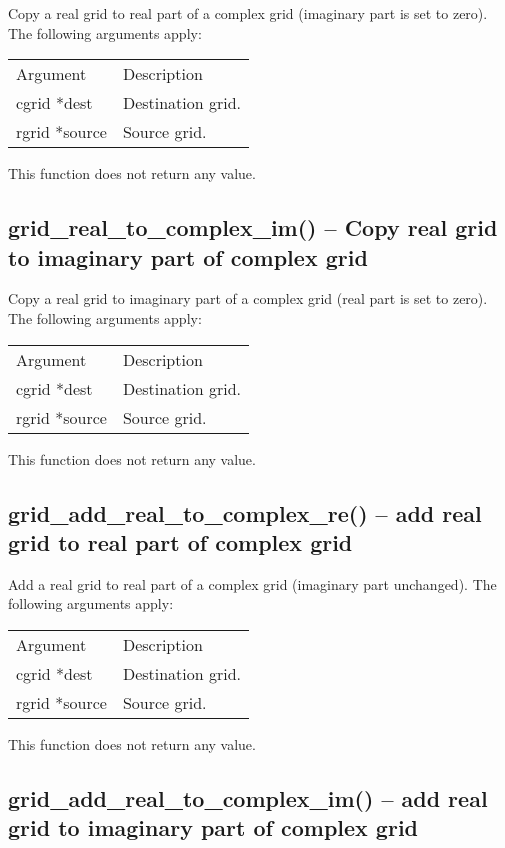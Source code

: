\documentclass[12pt,letterpaper]{report}
\begin{document}
Copy a real grid to real part of a complex grid (imaginary part is set to zero). The following arguments apply:
\begin{longtable}{p{} p{}}
Argument & Description\\
\cline{1-2}
cgrid *dest & Destination grid.\\
rgrid *source & Source grid.\\
\end{longtable}
\noindent
This function does not return any value.

\subsection{grid\_real\_to\_complex\_im() -- Copy real grid to imaginary part of complex grid}

Copy a real grid to imaginary part of a complex grid (real part is set to zero). The following arguments apply:
\begin{longtable}{p{} p{}}
Argument & Description\\
\cline{1-2}
cgrid *dest & Destination grid.\\
rgrid *source & Source grid.\\
\end{longtable}
\noindent
This function does not return any value.

\subsection{grid\_add\_real\_to\_complex\_re() -- add real grid to real part of complex grid}

Add a real grid to real part of a complex grid (imaginary part unchanged). The following arguments apply:
\begin{longtable}{p{} p{}}
Argument & Description\\
\cline{1-2}
cgrid *dest & Destination grid.\\
rgrid *source & Source grid.\\
\end{longtable}
\noindent
This function does not return any value.

\subsection{grid\_add\_real\_to\_complex\_im() -- add real grid to imaginary part of complex grid}
\end{document}
